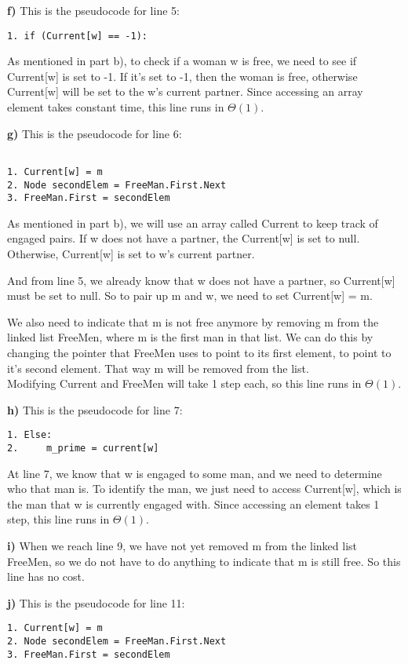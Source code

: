 \documentclass{article}
\begin{document}
\textbf{f)} This is the pseudocode for line 5:
\begin{lstlisting}
1. if (Current[w] == -1):
\end{lstlisting}

As mentioned in part b), to check if a woman w is free, we need to see if Current[w] is set to -1. If it's set to -1, then the woman is free, otherwise Current[w] will be set to the w's current partner. Since accessing an array element takes constant time, this line runs in $\Theta(1)$.


\textbf{g)} This is the pseudocode for line 6:
\begin{lstlisting}

1. Current[w] = m
2. Node secondElem = FreeMan.First.Next
3. FreeMan.First = secondElem
\end{lstlisting} 

As mentioned in part b), we will use an array called Current to keep track of engaged pairs. If w does not have a partner, the Current[w] is set to null. Otherwise, Current[w] is set to w's current partner. 

And from line 5, we already know that w does not have a partner, so Current[w] must be set to null. So to pair up m and w, we need to set Current[w] = m.

We also need to indicate that m is not free anymore by removing m from the linked list FreeMen, where m is the first man in that list. We can do this by changing the pointer that FreeMen uses to point to its first element, to point to it's second element. That way m will be removed from the list.\\
Modifying Current and FreeMen will take 1 step each, so this line runs in $\Theta(1)$.
 
\textbf{h)} This is the pseudocode for line 7:
\begin{lstlisting}
1. Else:
2.     m_prime = current[w]
\end{lstlisting}

At line 7, we know that w is engaged to some man, and we need to determine who that man is. To identify the man, we just need to access Current[w], which is the man that w is currently engaged with. Since accessing an element takes 1 step, this line runs in $\Theta(1)$.

\textbf{i)} When we reach line 9, we have not yet removed m from the linked list FreeMen, so we do not have to do anything to indicate that m is still free. So this line has no cost.

\textbf{j)} This is the pseudocode for line 11:
\begin{lstlisting}
1. Current[w] = m
2. Node secondElem = FreeMan.First.Next
3. FreeMan.First = secondElem
\end{lstlisting} 
\end{document}
